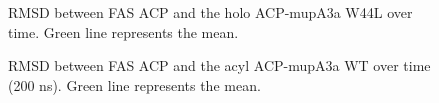 \begin{singlespacing}
		\setlength\fboxsep{5pt}
		\setlength\fboxrule{1.5pt}
		\begin{figure}[htbp]
		\centering
		\caption[RMSD between FAS ACP and the holo ACP-mupA3a W44L over time.]{RMSD between FAS ACP and the holo ACP-mupA3a W44L over time. Green line represents the mean.}
		\label{fig:RmsdAcpPPTMutant}
		\end{figure}
		
		\setlength\fboxsep{5pt}
		\setlength\fboxrule{1.5pt}
		\begin{figure}[htbp]
		\centering
		\caption[RMSD between FAS ACP and the acyl ACP-mupA3a WT over time (200 ns).]{RMSD between FAS ACP and the acyl ACP-mupA3a WT over time (200 ns). Green line represents the mean.}
		\label{fig:RMSDACPSPMWild_200}
		\end{figure}


\end{singlespacing}
